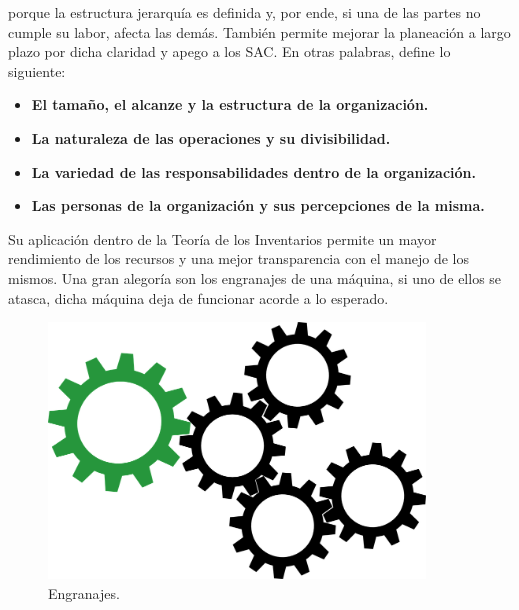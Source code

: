 \documentclass[letterpaper, 12pt]{article}
\begin{document}
    porque la estructura jerarquía es definida y, por ende, si una de las partes no cumple su labor, afecta las demás. También permite mejorar la planeación a largo plazo por dicha claridad y apego a los SAC. En otras palabras, define lo siguiente:
    \begin{itemize}
        \item \textbf{El tamaño, el alcanze y la estructura de la organización.}
        \item \textbf{La naturaleza de las operaciones y su divisibilidad.}
        \item \textbf{La variedad de las responsabilidades dentro de la organización.}
        \item \textbf{Las personas de la organización y sus percepciones de la misma.}
    \end{itemize}
    Su aplicación dentro de la Teoría de los Inventarios permite un mayor rendimiento de los recursos y una mejor transparencia con el manejo de los mismos. Una gran alegoría son los engranajes de una máquina, si uno de ellos se atasca, dicha máquina deja de funcionar acorde a lo esperado.
    \begin{figure}[H]
        \centering
        \includegraphics[width=10cm]{gears.png}
        \caption{Engranajes. }
    \end{figure}

    \newpage
\end{document}
